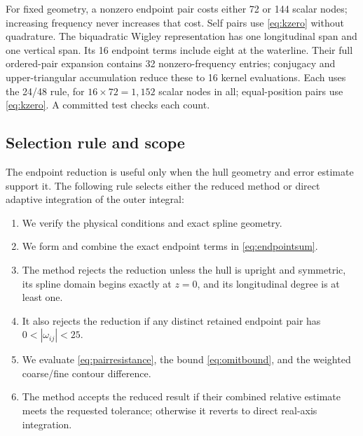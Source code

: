 \documentclass[10pt]{article}
\begin{document}
For fixed geometry, a nonzero endpoint pair costs either 72 or 144 scalar
nodes; increasing frequency never increases that cost.  Self pairs use
\cref{eq:kzero} without quadrature.  The biquadratic Wigley representation has
one longitudinal span and one vertical span.  Its 16 endpoint terms include
eight at the waterline.  Their full ordered-pair expansion contains 32
nonzero-frequency entries; conjugacy and upper-triangular accumulation reduce
these to 16 kernel evaluations.  Each uses the 24/48 rule, for
\(16\times72=1{,}152\) scalar nodes in all; equal-position pairs use
\cref{eq:kzero}.  A committed test checks each count.

\subsection{Selection rule and scope}
\label{sec:algorithm}

The endpoint reduction is useful only when the hull geometry and error estimate
support it.  The following rule selects either the reduced method or direct
adaptive integration of the outer integral:

\begin{enumerate}
  \item We verify the physical conditions and exact spline geometry.
  \item We form and combine the exact endpoint terms in
        \cref{eq:endpointsum}.
  \item The method rejects the reduction unless the hull is upright and
        symmetric, its spline domain begins exactly at \(z=0\), and its
        longitudinal degree is at least one.
  \item It also rejects the reduction if any distinct retained endpoint pair
        has \(0<|\omega_{ij}|<25\).
  \item We evaluate \cref{eq:pairresistance}, the bound
        \cref{eq:omitbound}, and the weighted coarse/fine contour difference.
  \item The method accepts the reduced result if their combined relative
        estimate meets the requested tolerance; otherwise it reverts to direct
        real-axis integration.
\end{enumerate}
\end{document}
